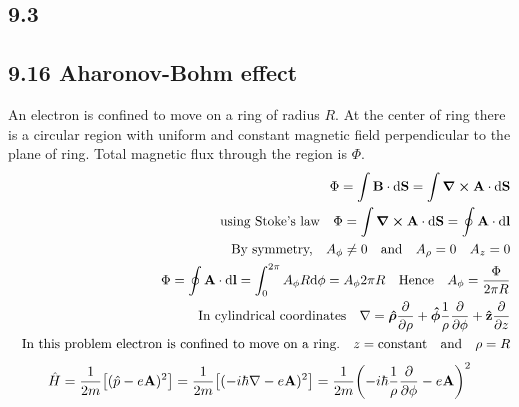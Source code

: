 \subsection*{9.3}
\newpage
\subsection*{9.16 Aharonov-Bohm effect}
An electron is confined to move on a ring of radius $R$. At the center of ring there is a circular region with uniform and constant magnetic field perpendicular to the plane of ring. Total magnetic flux through the region is $\Phi$. 
\begin{align*}
\Phi=\int\vb{B}\cdot\dd\vb{S}=\int\curl\vb{A}\cdot\dd\vb{S}
\\
\qq{using Stoke's law}
\Phi=\int\curl\vb{A}\cdot\dd\vb{S}=\oint\vb{A}\cdot\dd\vb{l}
\\
\qq{By symmetry,}A_{\phi}\ne 0\qq{and}A_{\rho}=0\quad A_z=0
\\
\Phi=\oint\vb{A}\cdot\dd\vb{l}=\int_0^{2\pi}A_{\phi}R\dd\phi=A_{\phi}2\pi R
\qq{Hence} A_{\phi}=\frac{\Phi}{2\pi R}
\\
\qq{In cylindrical coordinates}
\nabla=\vu{\bm\rho}\pdv{\rho}+\vu{\bm\phi}\frac{1}{\rho}\pdv{\phi}+\vu{z}\pdv{z}\\
\qq{In this problem electron is confined to move on a ring.}z=\text{constant}\qq{and}\rho=R
\end{align*}
\begin{align*}
\hat{H}=\frac{1}{2m}\qty[(\hat{p}-e\vb{A})^2]=\frac{1}{2m}\qty[(-i\hbar\nabla-e\vb{A})^2]=\frac{1}{2m}\qty(-i\hbar\frac{1}{\rho}\pdv{\phi}-e\vb{A})^2
\end{align*}


